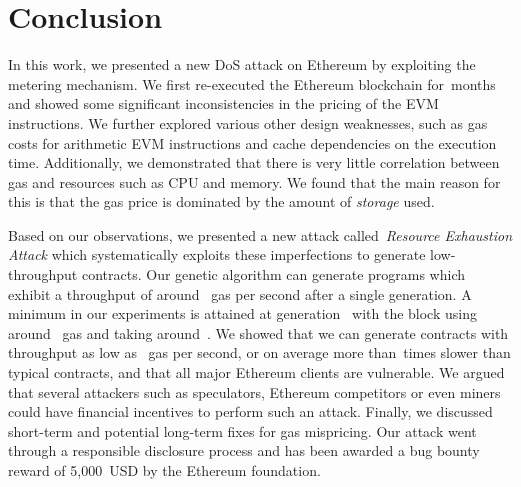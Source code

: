 \section{Conclusion}
\label{sec:3:conclusion}

In this work, we presented a new DoS attack on Ethereum by exploiting the metering mechanism. We first re-executed the Ethereum blockchain for~\Months months and showed some significant inconsistencies in the pricing of the EVM instructions. We further explored various other design weaknesses, such as gas costs for arithmetic EVM instructions and cache dependencies on the execution time. Additionally, we demonstrated that there is very little correlation between gas and resources such as CPU and memory. We found that the main reason for this is that the gas price is dominated by the amount of \emph{storage} used.

Based on our observations, we presented a new attack called~\emph{Resource Exhaustion Attack} which systematically exploits these imperfections to generate low-throughput contracts. Our genetic algorithm can generate programs which exhibit a throughput of around~ gas per second after a single generation. A minimum in our experiments is attained at generation~ with the block using around~ gas and taking around~.
We showed that we can generate contracts with throughput as low as~ gas per second, or on average more than~\Slowdown times slower than typical contracts, and that all major Ethereum clients are vulnerable. We argued that several attackers such as speculators, Ethereum competitors or even miners could have financial incentives to perform such an attack. Finally, we discussed short-term and potential long-term fixes for gas mispricing. Our attack went through a responsible disclosure process and has been awarded a bug bounty reward of 5,000~USD by the Ethereum foundation.
